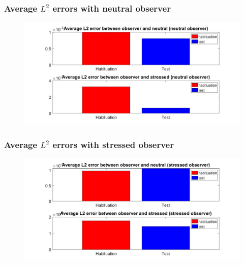 \documentclass{beamer}
\begin{document}
\begin{frame}
\frametitle{Average $L^2$ errors with neutral observer}


\begin{figure}[H]
	\begin{center}
		\hspace*{-1.7cm}
		\includegraphics[scale=.32]{avg_L2.jpg} 
	\end{center}  
	
	
\end{figure}



\end{frame}

\begin{frame}
\frametitle{Average $L^2$ errors with stressed observer}


\begin{figure}[H]
\begin{center}
	\hspace*{-1.7cm}
	\includegraphics[scale=.32]{avg_L22.jpg} 
\end{center}  


\end{figure}



\end{frame}
\end{document}
